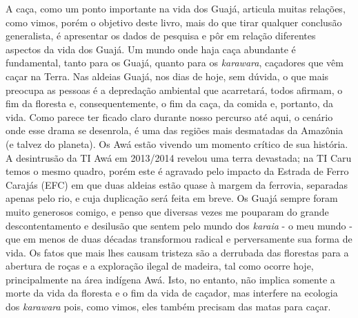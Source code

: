A caça, como um ponto importante na vida dos Guajá, articula muitas
relações, como vimos, porém o objetivo deste livro, mais do que tirar
qualquer conclusão generalista, é apresentar os dados de pesquisa e pôr
em relação diferentes aspectos da vida dos Guajá. Um mundo onde haja
caça abundante é fundamental, tanto para os Guajá, quanto para os
\emph{karawara}, caçadores que vêm caçar na Terra. Nas aldeias Guajá,
nos dias de hoje, sem dúvida, o que mais preocupa as pessoas é a
depredação ambiental que acarretará, todos afirmam, o fim da floresta e,
consequentemente, o fim da caça, da comida e, portanto, da vida. Como
parece ter ficado claro durante nosso percurso até aqui, o cenário onde
esse drama se desenrola, é uma das regiões mais desmatadas da Amazônia
(e talvez do planeta). Os Awá estão vivendo um momento crítico de sua
história. A desintrusão da TI Awá em 2013/2014 revelou uma terra
devastada; na TI Caru temos o mesmo quadro, porém este é agravado pelo
impacto da Estrada de Ferro Carajás (EFC) em que duas aldeias estão
quase à margem da ferrovia, separadas apenas pelo rio, e cuja duplicação
será feita em breve. Os Guajá sempre foram muito generosos comigo, e
penso que diversas vezes me pouparam do grande descontentamento e
desilusão que sentem pelo mundo dos \emph{karaia} - o meu mundo - que em
menos de duas décadas transformou radical e perversamente sua forma de
vida. Os fatos que mais lhes causam tristeza são a derrubada das
florestas para a abertura de roças e a exploração ilegal de madeira, tal
como ocorre hoje, principalmente na área indígena Awá. Isto, no entanto,
não implica somente a morte da vida da floresta e o fim da vida de
caçador, mas interfere na ecologia dos \emph{karawara} pois, como vimos,
eles também precisam das matas para caçar.


